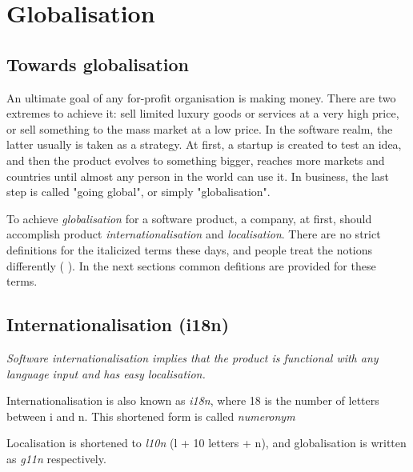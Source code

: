 
\chapter{Globalisation}

\section{Towards globalisation}

An ultimate goal of any for-profit organisation is making money. 
There are two extremes to achieve it: sell limited luxury goods or services at a very high price, or sell something to the mass market at a low price. 
In the software realm, the latter usually is taken as a strategy. 
At first, a startup is created to test an idea, and then the product evolves to something bigger, reaches more markets and countries until almost any person in the world can use it. 
In business, the last step is called "going global", or simply "globalisation".


To achieve \textit{globalisation} for a software product, a company, at first, should accomplish product \textit{internationalisation} and \textit{localisation}.
There are no strict definitions for the italicized terms these days, and people treat the notions differently (\cite{anastasiou2010translating} \cite{w3cqainternationalisation} \cite{i18nvsg10nkaplan} \cite{dotnetglobalisation}). In the next sections common defitions are provided for these terms. 




\section{Internationalisation (i18n)}

\textit{Software internationalisation implies that the product is functional with any language input and has easy localisation.}

\begin{tcolorbox}
    Internationalisation is also known as \textit{i18n}, where 18 is the number of letters between i and n. This shortened form is called \textit{numeronym} \cite{i18norigin}
\end{tcolorbox}

\begin{tcolorbox}
    Localisation is shortened to \textit{l10n} (l + 10 letters + n), and globalisation is written as \textit{g11n} respectively.
\end{tcolorbox}

